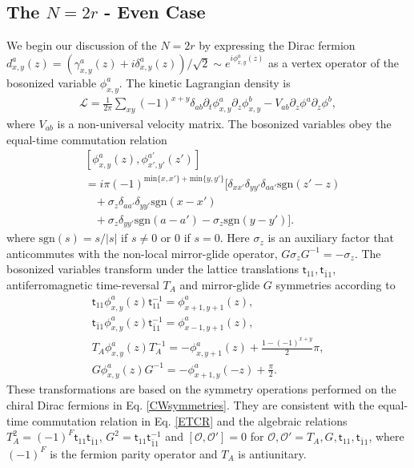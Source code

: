 \subsection{The \texorpdfstring{$N=2r$}{N=2r} - Even Case}
We begin our discussion of the {$N=2r$} by expressing the Dirac fermion $d^a_{x,y}(z)=(\gamma^a_{x,y}(z)+i\delta^a_{x,y}(z))/\sqrt{2}\sim e^{i\phi^a_{x,y}(z)}$ as a vertex operator of the bosonized variable $\phi^a_{x,y}$. The kinetic Lagrangian density is \begin{gather}\mathcal{L}=\frac{1}{2\pi}\sum_{xy}(-1)^{x+y}\delta_{ab}\partial_t\phi^a_{x,y}\partial_z\phi^b_{x,y}-V_{ab}\partial_z\phi^a\partial_z\phi^b,\label{L0}\end{gather} where $V_{ab}$ is a non-universal velocity matrix. The bosonized variables obey the equal-time commutation relation \begin{align}
&
\left[\phi_{x,y}^a(z),\phi_{x',y'}^{a'}(z')\right]
\nonumber\\&
=i\pi(-1)^{\mathrm{min}\{x,x'\}+\mathrm{min}\{y,y'\}}\big[\delta_{xx'}\delta_{yy'}\delta_{aa'}\mathrm{sgn}(z'-z)
\nonumber\\&\;\;\;+\sigma_z\delta_{aa'}\delta_{yy'}\mathrm{sgn}(x-x')
\nonumber\\&\;\;\;+\sigma_z\delta_{yy'}\mathrm{sgn}(a-a')-\sigma_z\mathrm{sgn}(y-y')\big].
\label{ETCR}
\end{align} where $\mathrm{sgn}(s)=s/|s|$ if $s\neq0$ or $0$ if $s=0$. Here $\sigma_z$ is an auxiliary factor that anticommutes with the non-local mirror-glide operator, $G\sigma_zG^{-1}=-\sigma_z$. The bosonized variables transform under the lattice translations $\mathsf{t}_{11},\mathsf{t}_{\bar{1}1}$, antiferromagnetic time-reversal $T_A$ and mirror-glide $G$ symmetries according to \begin{gather}\mathsf{t}_{11}\phi^a_{x,y}(z)\mathsf{t}_{11}^{-1}=\phi^a_{x+1,y+1}(z),\nonumber\\\mathsf{t}_{\bar{1}1}\phi^a_{x,y}(z)\mathsf{t}_{\bar{1}1}^{-1}=\phi^a_{x-1,y+1}(z),\nonumber\\T_A\phi_{x,y}^a(z)T_A^{-1}=-\phi_{x,y+1}^a(z)+\frac{1-(-1)^{x+y}}{2}\pi,\nonumber\\G\phi^a_{x,y}(z)G^{-1}=-\phi_{x+1,y}^a(-z)+\frac{\pi}{2}.\label{bosonsymmtrans}\end{gather} These transformations are based on the symmetry operations performed on the chiral Dirac fermions in Eq. \eqref{CWsymmetries}. They are consistent with the equal-time commutation relation in Eq. \eqref{ETCR} and the algebraic relations $T_A^2=(-1)^F\mathsf{t}_{11}\mathsf{t}_{\bar{1}1}$, $G^2=\mathsf{t}_{11}\mathsf{t}_{\bar{1}1}^{-1}$ and $[\mathcal{O},\mathcal{O}']=0$ for $\mathcal{O},\mathcal{O}'=T_A,G,\mathsf{t}_{11},\mathsf{t}_{\bar{1}1}$, where $(-1)^F$ is the fermion parity operator and $T_A$ is antiunitary.

